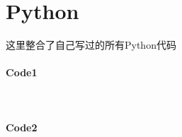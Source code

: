 %
%
	\newpage
	\section{Python}
	这里整合了自己写过的所有Python代码
	\paragraph{Code1}~\\
	
	\paragraph{Code2}~\\
	
%	
%	
%